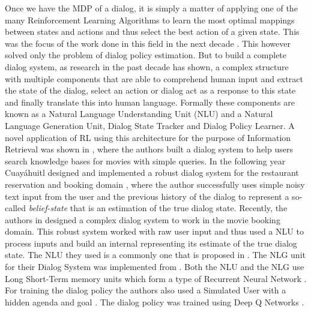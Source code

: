 \documentclass[12pt]{extarticle}
\numberwithin{equation}{section}
\begin{document}
	Once we have the MDP of a dialog, it is simply a matter of applying one of the many Reinforcement Learning Algorithms to learn the most optimal mappings between states and actions and thus select the best action of a given state. This was the focus of the work done in this field in the next decade \cite{Young99probabilisticmethods}\cite{Singh_mdp}\cite{Pietquin_mdp}. This however solved only the problem of dialog policy estimation. But to build a complete dialog system, as research in the past decade has shown, a complex structure with multiple components that are able to comprehend human input and extract the state of the dialog, select an action or dialog act as a response to this state and finally translate this into human language. Formally these components are known as  a Natural Language Understanding Unit (NLU) and a Natural Language Generation Unit, Dialog State Tracker and Dialog Policy Learner. A novel application of RL using this architecture for the purpose of Information Retrieval was shown in \cite{Dhingra2016EndtoEndRL}, where the authors built a dialog system to help users search knowledge bases for movies with simple queries. In the following year Cuayáhuitl designed and implemented a robust dialog system for the restaurant reservation and booking domain \cite{Cuayhuitl2016SimpleDSAS}, where the author successfully uses simple noisy text input from the user and the previous history of the dialog to represent a so-called \textit{belief-state} that is an estimation of the true dialog state. Recently, the authors in \cite{Li17e2eDS} designed a complex dialog system to work in the movie booking domain. This robust system worked with raw user input and thus used a NLU to process inputs and build an internal  representing its estimate of the true dialog state. The NLU they used is a commonly one that is proposed in \cite{HakkaniTr2016NLU}. The NLG unit for their Dialog System was implemented from \cite{Wen_NLG}. Both the NLU and the NLG use Long Short-Term memory units which form a type of Recurrent Neural Network \cite{hochreiter1997long}. For training the dialog policy the authors also used a Simulated User with a hidden agenda and goal \cite{Schatzmann_agenda_sim}\cite{Li_user_sim}. The dialog policy was trained using Deep Q Networks \cite{Mnih_DQN}.
\end{document}
